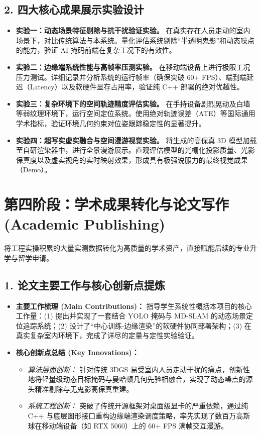 \documentclass[11pt, a4paper]{ctexart}
\begin{document}
\subsection{2. 四大核心成果展示实验设计}
\begin{itemize}[label=$\bullet$]
    \item \textbf{实验一：动态场景特征剔除与抗干扰验证实验。} 在真实存在人员走动的室内场景下，对比传统算法与本系统。量化评估系统剔除“半透明鬼影”和动态噪点的能力，验证 AI 掩码前端在复杂工况下的有效性。
    \item \textbf{实验二：边缘端系统性能与高帧率压测实验。} 在移动端设备上进行极限工况压力测试。详细记录并分析系统的运行帧率（确保突破 60+ FPS）、端到端延迟（Latency）以及软硬件显存占用率，验证纯 C++ 部署的绝对优越性。
    \item \textbf{实验三：复杂环境下的空间轨迹精度评估实验。} 在手持设备剧烈晃动及白墙等弱纹理环境下，运行空间定位系统。使用绝对轨迹误差（ATE）等国际通用学术指标，验证环境几何约束对位姿跟踪稳定性的显著提升。
    \item \textbf{实验四：超写实虚实融合与空间漫游视觉实验。} 将生成的高保真 3D 模型加载至自研渲染器中，进行全景漫游展示。直观评估模型的光栅化投影质量、光影保真度以及虚实视角的实时映射效果，形成具有极强说服力的最终视觉成果（Demo）。
\end{itemize}

\section{第四阶段：学术成果转化与论文写作 (Academic Publishing)}

将工程实操积累的大量实测数据转化为高质量的学术资产，直接赋能后续的专业升学与留学申请。

\subsection{1. 论文主要工作与核心创新点提炼}
\begin{itemize}[label=$\bullet$]
    \item \textbf{主要工作梳理 (Main Contributions)：} 指导学生系统性概括本项目的核心工作量：(1) 提出并实现了一套结合 YOLO 掩码与 MD-SLAM 的动态场景定位追踪系统；(2) 设计了“中心训练-边缘渲染”的软硬件协同部署架构；(3) 在真实复杂室内环境下，完成了详尽的定量与定性实验验证。
    \item \textbf{核心创新点总结 (Key Innovations)：}
        \begin{itemize}[label=$\circ$]
            \item \textit{算法层面创新：} 针对传统 3DGS 易受室内人员走动干扰的痛点，创新性地将轻量级动态目标掩码与曼哈顿几何先验相融合，实现了动态噪点的源头精准剔除与无鬼影高保真重建。
            \item \textit{系统工程创新：} 突破了传统开源框架对桌面级显卡的严重依赖，通过纯 C++ 与底层图形接口重构边缘端渲染调度策略，率先实现了数百万高斯球在移动端设备（如 RTX 5060）上的 60+ FPS 满帧交互漫游。
        \end{itemize}
\end{itemize}
\end{document}
